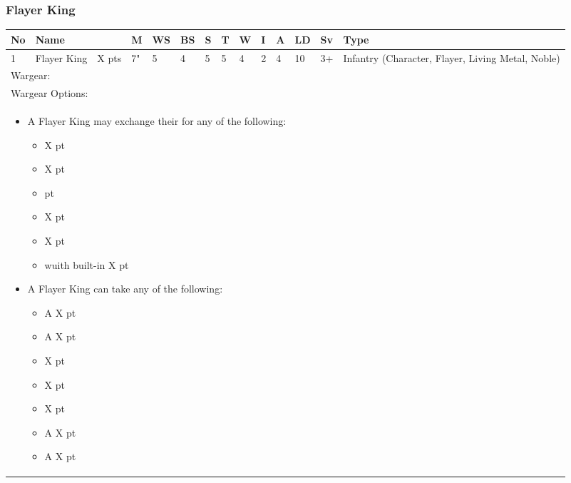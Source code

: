 \newpage
\subsubsection{Flayer King}

\noindent
\begin{tabular}{||m{10pt} m{90pt} m{30pt} m{11pt} m{11pt} m{11pt} m{11pt} m{11pt} m{11pt} m{11pt} m{11pt} m{11pt} m{11pt} m{135pt}||}
	\hline
	No & Name & & M & WS & BS & S & T & W & I & A & LD & Sv & Type \\
	\hline
	1 & Flayer King & X pts & 7" & 5 & 4 & 5 & 5 & 4 & 2 & 4 & 10 & 3+ & Infantry (Character, Flayer, Living Metal, Noble)\\
	\hline
	\hline
	\multicolumn{14}{||Z{532 pt}||}{Wargear: \quickref{Staff of Light}}\\
	\multicolumn{14}{||Z{532 pt}||}{Wargear Options:} \\	
	\multicolumn{14}{||Z{532 pt}||}{\begin{itemize}
			\item A Flayer King may exchange their \quickref{Staff of Light} for any of the following:
			\begin{itemize}
				\item \quickref{Hyperphase Sword} \hrulefill X pt
				\item \quickref{Rod of Night} \hrulefill X pt
				\item \quickref{Voidblade} \hrulefill 0 pt
				\item \quickref{Voidscythe} \hrulefill X pt
				\item \quickref{Warscythe} \hrulefill X pt
				\item \quickref{Warscythe} wuith built-in \quickref{Relic Gauss Blaster} \hrulefill X pt
			\end{itemize}
			\item A Flayer King can take any of the following:
			\begin{itemize}
				\item A \quickref{Gauntlet of Fire} \hrulefill X pt
				\item A \quickref{Tachyon Arrow} \hrulefill X pt
				\item \quickref{Bloodswarm Scarabs} \hrulefill X pt
				\item \quickref{Flensing Scarabs} \hrulefill X pt
				\item \quickref{Mindshackle Scarabs} \hrulefill X pt
				\item A \quickref{Phase Shifter} \hrulefill X pt
				\item A \quickref{Phylactery} \hrulefill X pt

\end{itemize}
\end{itemize}}
\end{tabular}
